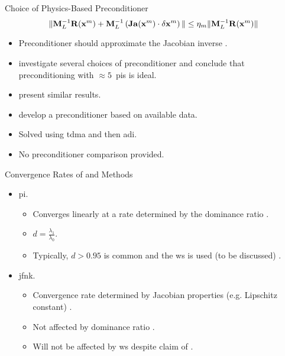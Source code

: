 \begin{frame}{Choice of Physics-Based Preconditioner}
  \begin{equation}
    \label{eq:left_precondition}
    \| \mathbf{M}_L^{-1} \mathbf{R}(\mathbf{x}^m) + \mathbf{M}_L^{-1} \left( \mathbf{Ja}(\mathbf{x}^m)
      \cdot \delta\mathbf{x}^m \right) \| \le \eta_m \| \mathbf{M}_L^{-1} \mathbf{R}(\mathbf{x}^m) \|
  \end{equation}
  \begin{itemize}
    \item Preconditioner should approximate the Jacobian inverse
      \cite{textbookkelley}.
    \item \citeauthor{gill_azmy} investigate several choices of preconditioner
      and conclude that preconditioning with $\approx 5$~\glspl{pi} is ideal.
    \item \citeauthor{jfnk_wielandt} present similar results.
    \item \citeauthor{qe2paper} develop a preconditioner based on available
      data.
    \item Solved using \gls{tdma} and then \gls{adi}.
    \item No preconditioner comparison provided.
  \end{itemize}
\end{frame}

\begin{frame}{Convergence Rates of  and 
  Methods}
  \begin{itemize}
    \item \gls{pi}.
    \begin{itemize}
      \item Converges linearly at a rate determined by the dominance ratio
        \cite{nakamura}.
      \item $d = \frac{\lambda_1}{\lambda_0}$.
      \item Typically, $d > 0.95$ is common and the \gls{ws} is used (to be 
        discussed) \cite{gehinThesis}.
    \end{itemize}
    \item \gls{jfnk}.
    \begin{itemize}
      \item Convergence rate determined by Jacobian properties (e.g. Lipschitz
        constant) \cite{textbookkelley}.
      \item Not affected by dominance ratio \cite{gill_azmy}.
      \item Will not be affected by \gls{ws} despite claim of
        \citeauthor{qe2paper}.
    \end{itemize}
  \end{itemize}
\end{frame}
